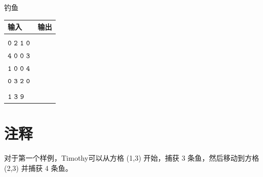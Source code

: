 \documentclass{xcpczh}
\begin{document}
\begin{problem}{钓鱼}
		\begin{table}[h]
			\begin{tabularx}{\textwidth}{|>{\raggedright\arraybackslash}X|>{\raggedright\arraybackslash}X|}
				\hline
				\textbf{输入} & \textbf{输出} \\ \hline
				\makecell[l]{$\tt{4\ 4}$\\$\tt{0\ 2\ 1\ 0}$\\$\tt{4\ 0\ 0\ 3}$\\$\tt{1\ 0\ 0\ 4}$\\$\tt{0\ 3\ 2\ 0}$} & \makecell[l]{$\tt{7}$} \\ \hline
				\makecell[l]{$\tt{1\ 3}$\\$\tt{1\ 3\ 9}$} & \makecell[l]{$\tt{13}$} \\ \hline
			\end{tabularx}
		\end{table}
		\section*{注释}
		
		对于第一个样例，Timothy可以从方格 (1,3) 开始，捕获 3 条鱼，然后移动到方格 (2,3) 并捕获 4 条鱼。
	\end{problem}
\end{document}
